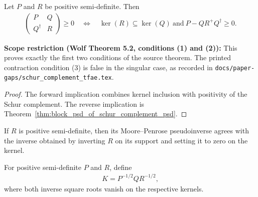 \begin{theorem}
  \label{thm:block_psd_iff_schur_complement_psd}
  \leanok
  Let $P$ and $R$ be positive semi-definite. Then
  \begin{align}
    \begin{pmatrix}P&Q\\Q^\dagger&R\end{pmatrix}\ge 0
    \quad\Longleftrightarrow\quad
    \ker(R)\subseteq\ker(Q)
    \ \text{and}\ P-QR^+Q^\dagger\ge 0.
  \end{align}

  \textbf{Scope restriction (Wolf Theorem 5.2, conditions (1) and (2)):}
  This proves exactly the first two conditions of the source theorem. The
  printed contraction condition (3) is false in the singular case, as recorded in
  \texttt{docs/paper-gaps/schur\_complement\_tfae.tex}.
\end{theorem}

\begin{proof}\leanok
  The forward implication combines kernel inclusion with positivity of the
  Schur complement. The reverse implication is
  Theorem~\ref{thm:block_psd_of_schur_complement_psd}.
\end{proof}

\begin{theorem}
  \label{thm:schur_pinv_eq_support_inverse}
  \leanok
  If $R$ is positive semi-definite, then its Moore--Penrose pseudoinverse
  agrees with the inverse obtained by inverting $R$ on its support and setting
  it to zero on the kernel.
\end{theorem}

\begin{definition}
  \label{def:schur_contraction}
  \leanok
  For positive semi-definite $P$ and $R$, define
  \begin{align}
    K=P^{-1/2}QR^{-1/2},
  \end{align}
  where both inverse square roots vanish on the respective kernels.
\end{definition}

